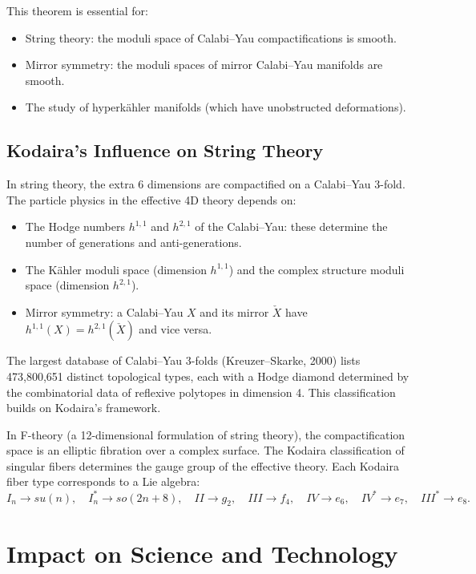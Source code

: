 This theorem is essential for:
\begin{itemize}
    \item String theory: the moduli space of Calabi--Yau compactifications is smooth.
    \item Mirror symmetry: the moduli spaces of mirror Calabi--Yau manifolds are smooth.
    \item The study of hyperk\"{a}hler manifolds (which have unobstructed deformations).
\end{itemize}

\subsection{Kodaira's Influence on String Theory}

In string theory, the extra 6 dimensions are compactified on a Calabi--Yau 3-fold. The particle physics in the effective 4D theory depends on:
\begin{itemize}
    \item The Hodge numbers $h^{1,1}$ and $h^{2,1}$ of the Calabi--Yau: these determine the number of generations and anti-generations.
    \item The K\"{a}hler moduli space (dimension $h^{1,1}$) and the complex structure moduli space (dimension $h^{2,1}$).
    \item Mirror symmetry: a Calabi--Yau $X$ and its mirror $\check{X}$ have $h^{1,1}(X) = h^{2,1}(\check{X})$ and vice versa.
\end{itemize}

The largest database of Calabi--Yau 3-folds (Kreuzer--Skarke, 2000) lists 473,800,651 distinct topological types, each with a Hodge diamond determined by the combinatorial data of reflexive polytopes in dimension 4. This classification builds on Kodaira's framework.

In F-theory (a 12-dimensional formulation of string theory), the compactification space is an elliptic fibration over a complex surface. The Kodaira classification of singular fibers determines the gauge group of the effective theory. Each Kodaira fiber type corresponds to a Lie algebra:
\[
I_n \to su(n), \quad I_n^* \to so(2n+8), \quad II \to g_2, \quad III \to f_4, \quad IV \to e_6, \quad IV^* \to e_7, \quad III^* \to e_8.
\]

\section{Impact on Science and Technology}

